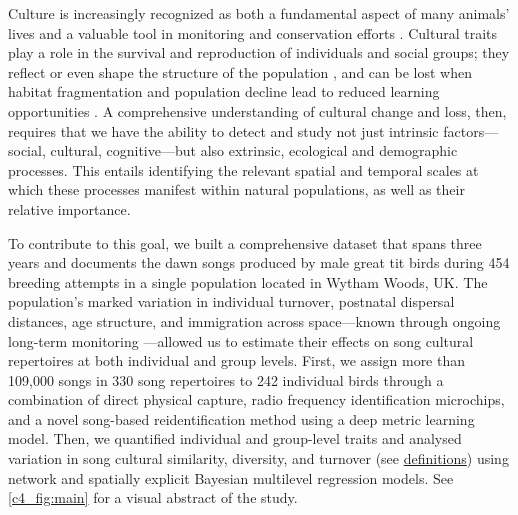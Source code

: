 \documentclass[9pt, onecolumn, twoside, lineno]{gsajnl}
\begin{document}
Culture is increasingly recognized as both a fundamental aspect of many animals' lives and a valuable tool in monitoring and conservation efforts \autocite{brakes2019, brakes2021}. Cultural traits play a role in the survival and reproduction of individuals and social groups; they reflect or even shape the structure of the population \autocite{brakes2019}, and can be lost when habitat fragmentation and population decline lead to reduced learning opportunities \autocite{paxton2019, crates2021}. A comprehensive understanding of cultural change and loss, then, requires that we have the ability to detect and study not just intrinsic factors---social, cultural, cognitive---but also extrinsic, ecological and demographic processes. This entails identifying the relevant spatial and temporal scales at which these processes manifest within natural populations, as well as their relative importance. 

To contribute to this goal, we built a comprehensive dataset that spans three years and documents the dawn songs produced by male great tit birds during 454 breeding attempts in a single population located in Wytham Woods, UK. The population's marked variation in individual turnover, postnatal dispersal distances, age structure, and immigration across space---known through ongoing long-term monitoring \autocite{lack1964}---allowed us to estimate their effects on song cultural repertoires at both individual and group levels. First, we assign more than 109,000 songs in 330 song repertoires to 242 individual birds through a combination of direct physical capture, radio frequency identification microchips, and a novel song-based reidentification method using a deep metric learning model. Then, we quantified individual and group-level traits and analysed variation in song cultural similarity, diversity, and turnover (see \hyperref[sc:group-properties]{definitions}) using network and spatially explicit Bayesian multilevel regression models. See \autoref{c4_fig:main} for a visual abstract of the study.
\end{document}

